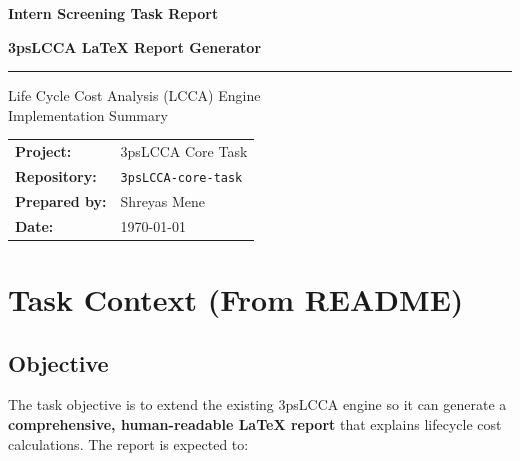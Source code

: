 \documentclass[11pt]{article}
\begin{document}
\begin{titlepage}
  \pagecolor{navyblue}
  \color{white}
  \centering
  \vspace*{3cm}

  {\fontsize{26}{32}\bfseries\selectfont Intern Screening Task Report\par}
  \vspace{0.5em}
  {\fontsize{17}{24}\bfseries\selectfont 3psLCCA \LaTeX{} Report Generator\par}

  \vspace{0.9em}
  \textcolor{white!50}{\rule{0.5\linewidth}{0.5pt}}
  \vspace{0.9em}

  {\large Life Cycle Cost Analysis (LCCA) Engine\\[0.3em]
   Implementation Summary\par}

  \vfill

  \renewcommand{\arraystretch}{1.5}
  \begin{tabular}{@{} L{3.5cm} L{7cm} @{}}
    \textbf{Project:}      & 3psLCCA Core Task \\
    \textbf{Repository:}   & \texttt{3psLCCA-core-task} \\
    \textbf{Prepared by:}  & Shreyas Mene \\
    \textbf{Date:}         & \today \\
  \end{tabular}
  \renewcommand{\arraystretch}{1}

  \vspace{2.5cm}
\end{titlepage}
\nopagecolor

\tableofcontents
\clearpage

\section{Task Context (From README)}

\subsection{Objective}
The task objective is to extend the existing 3psLCCA engine so it can generate a
\textbf{comprehensive, human-readable \LaTeX{} report} that explains lifecycle cost
calculations. The report is expected to:
\end{document}
